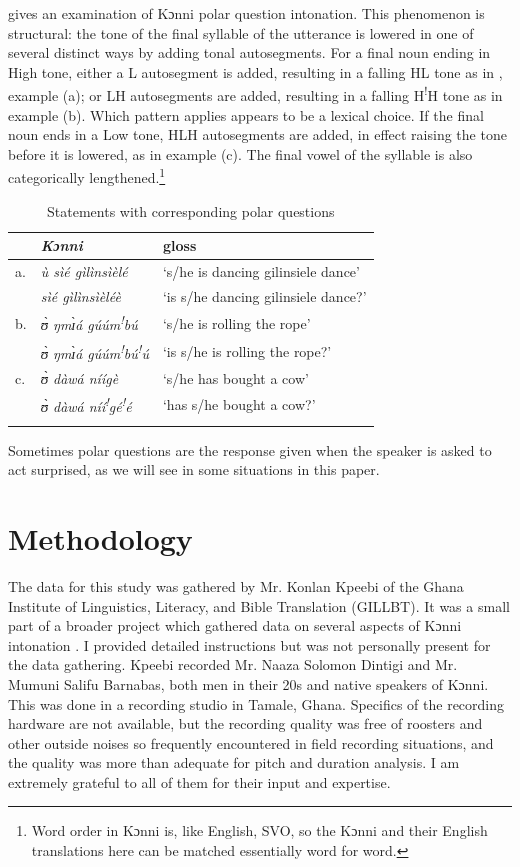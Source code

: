 \documentclass[output=paper]{langsci/langscibook}
\begin{document}
\citet{cahill2012} gives an examination of Kɔnni polar question intonation. This phenomenon is structural: the tone of the final syllable of the utterance is lowered in one of several distinct ways by adding tonal autosegments. For a final noun ending in High tone, either a L autosegment is added, resulting in a falling HL tone as in , example (a); or LH autosegments are added, resulting in a falling H\textsuperscript{!}H tone as in example (b). Which pattern applies appears to be a lexical choice. If the final noun ends in a Low tone, HLH autosegments are added, in effect raising the tone before it is lowered, as in example (c). The final vowel of the syllable is also categorically lengthened.\footnote{Word order in Kɔnni is, like English, SVO, so the Kɔnni and their English translations here can be matched essentially word for word.}

\begin{table}
\begin{tabular}{l>{\itshape}ll} 
\lsptoprule
& Kɔnni  & gloss\\
\midrule
a.  & ù sìé gìlìnsìèlé & `s/he is dancing gilinsiele dance'\\
    &   sìé gìlìnsìèléè & `is s/he dancing gilinsiele dance?'\\
b.  & ʊ̀ ŋmɪ̀á gúúm\textsuperscript{!}bú & `s/he is rolling the rope'\\
    & ʊ̀ ŋmɪ̀á gúúm\textsuperscript{!}bú\textsuperscript{!}ú & `is s/he is rolling the rope?'\\
c.  & ʊ̀ dàwá níígè & `s/he has bought a cow'\\
    & ʊ̀ dàwá níí\textsuperscript{!}gé\textsuperscript{!}é & `has s/he bought a cow?'\\
\lspbottomrule
\end{tabular}

\caption{Statements with corresponding polar questions}
\label{tab:1.cahill}
\end{table}



Sometimes polar questions are the response given when the speaker is asked to act surprised, as we will see in some situations in this paper. 

\section{Methodology}
The data for this study was gathered by Mr. Konlan Kpeebi of the Ghana Institute of Linguistics, Literacy, and Bible Translation (GILLBT). It was a small part of a broader project which gathered data on several aspects of Kɔnni intonation \citep{cahill2016intonation}. I provided detailed instructions but was not personally present for the data gathering. Kpeebi recorded Mr. Naaza Solomon Dintigi and Mr. Mumuni Salifu Barnabas, both men in their 20s and native speakers of Kɔnni. This was done in a recording studio in Tamale, Ghana. Specifics of the recording hardware are not available, but the recording quality was free of roosters and other outside noises so frequently encountered in field recording situations, and the quality was more than adequate for pitch and duration analysis. I am extremely grateful to all of them for their input and expertise.
\end{document}
